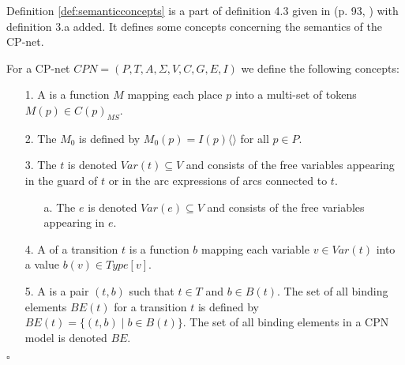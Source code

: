 \noindent
Definition \ref{def:semanticconcepts} is a part of definition 4.3 given in (p. 93, \cite{RefWorks:87}) with definition 3.a added. It defines some concepts concerning the semantics of the CP-net.

\begin{definition}
\label{def:semanticconcepts}

For a CP-net $\mathit{CPN} = (P,T,A,\Sigma,V,C,G,E,I)$ we define the following concepts:

\begin{enumerate}

\item[1.] A  is a function $M$ mapping each place
$p$ into a multi-set of tokens $M(p) \in C(p)_{MS}$.

\item[2.] The  $M_0$ is defined by $M_0(p)
= I(p)\langle \rangle$ for all $p \in P$.

\item[3.] The  $t$ is denoted
$\mathit{Var}(t) \subseteq V$ and consists of the free variables appearing in
the guard of $t$ or in the arc expressions of arcs connected to $t$.

\begin{enumerate}
\item[a.] The  $e$ is denoted $\mathit{Var}(e) \subseteq V$ and consists of the free variables appearing in $e$.
\end{enumerate}

\item[4.] A  of a transition $t$ is a function $b$
mapping each variable $v \in \mathit{Var}(t)$ into a value $b(v) \in
\mathit{Type}[v]$.

\item[5.] A  is a pair $(t,b)$ such that
$t \in T$ and $b \in B(t)$. The set of all binding elements
$\mathit{BE}(t)$ for a transition $t$ is defined by $\mathit{BE}(t) =
\{ (t,b) \; | \; b \in B(t) \}$. The set of all binding elements in a
CPN model is denoted $\mathit{BE}$.


\end{enumerate}
\flushright $\square$
\end{definition}